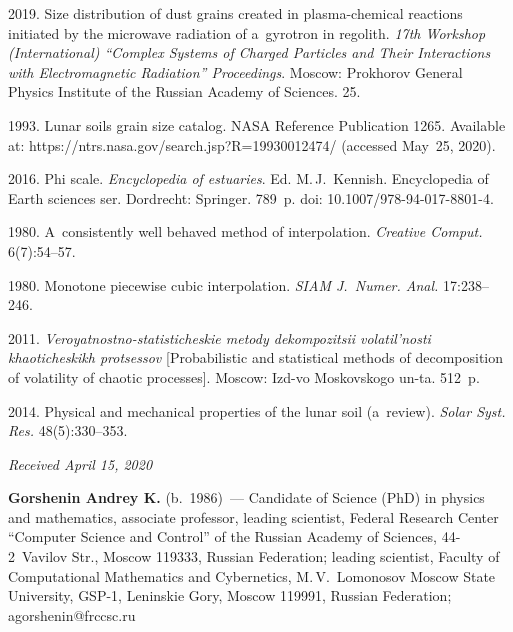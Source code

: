 \begin{multicols}{2}
{{\begin{thebibliography}{99}
 2019. Size distribution of 
dust grains created in plasma-chemical reactions initiated by the 
microwave radiation of a~gyrotron in regolith. \textit{17th Workshop 
(International) ``Complex Systems of Charged Particles and Their 
Interactions with Electromagnetic Radiation'' Proceedings}. Moscow:
Prokhorov General Physics Institute 
of the Russian Academy of Sciences. 25.

 1993. Lunar soils grain size catalog. 
NASA Reference 
Publication 1265. Available at: 
{\sf  
https://ntrs.nasa.gov/search.jsp?R=19930012474/} (accessed May~25, 2020).

 2016. Phi scale. \textit{Encyclopedia of 
estuaries}. Ed. M.\,J.~Kennish. 
Encyclopedia of Earth sciences ser.
Dordrecht: Springer. 789~p. doi: 10.1007/978-94-017-8801-4.

 1980. A~consistently well behaved method of 
interpolation. \textit{Creative Comput.}  
6(7):54--57.

 1980. Monotone piecewise cubic 
interpolation. \textit{SIAM J.~Numer. Anal.} 17:238--246.

 2011. \textit{Veroyatnostno-statisticheskie metody 
dekompozitsii 
volatil'nosti khaoticheskikh protsessov} [Probabilistic and statistical 
methods of decomposition of volatility of chaotic processes]. Moscow: 
Izd-vo Moskovskogo un-ta. 512~p.

 2014. Physical and mechanical properties of the 
lunar soil (a~review). \textit{Solar Syst. Res.} 48(5):330--353.

\end{thebibliography}

 }
 }

\end{multicols}

\vspace*{-9pt}

\hfill{\small\textit{Received April 15, 2020}}





\Contr

\noindent
\textbf{Gorshenin Andrey K.} (b.\ 1986)~--- Candidate of Science (PhD) in 
physics and
mathematics, associate professor, leading scientist, Federal Research 
Center ``Computer Science and Control'' of the Russian Academy of 
Sciences, 44-2~Vavilov Str., Moscow 119333, Russian Federation; leading 
scientist, Faculty of Computational Mathematics and Cybernetics, 
M.\,V.~Lomonosov Moscow State University, GSP-1, Leninskie Gory, Moscow 
119991, Russian Federation; \mbox{agorshenin@frccsc.ru}

